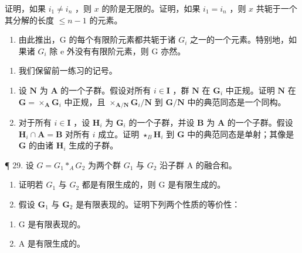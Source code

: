 证明，如果 \(i_1 \neq i_n\) ，则 \(x\) 的阶是无限的。证明，如果 \(i_1 = i_n\) ，则 \(x\) 共轭于一个其分解的长度 \(\leqslant n - 1\) 的元素。

\begin{enumerate}
\def\labelenumi{(\alph{enumi})}
\setcounter{enumi}{1}
\tightlist
\item
  由此推出，G 的每个有限阶元素都共轭于诸 \(G_{i}\) 之一的一个元素。特别地，如果诸 \(G_{i}\) 除 e 外没有有限阶元素，则 G 亦然。
\end{enumerate}

\begin{enumerate}
\def\labelenumi{\arabic{enumi}.}
\setcounter{enumi}{27}
\tightlist
\item
  我们保留前一练习的记号。
\end{enumerate}

\begin{enumerate}
\def\labelenumi{(\alph{enumi})}
\item
  设 \(\mathbf{N}\) 为 \(\mathbf{A}\) 的一个子群。假设对所有 \(i \in \mathbf{I}\) ，群 \(\mathbf{N}\) 在 \(\mathbf{G}_i\) 中正规。证明 \(\mathbf{N}\) 在 \(\mathbf{G} = \times_{\mathbf{A}} \mathbf{G}_i\) 中正规，且 \(\times_{\mathbf{A/N}} \mathbf{G}_i / \mathbf{N}\) 到 \(\mathbf{G}/\mathbf{N}\) 中的典范同态是一个同构。
\item
  对于所有 \(i \in \mathbf{I}\) ，设 \(\mathbf{H}_i\) 为 \(\mathbf{G}_i\) 的一个子群，并设 \(\mathbf{B}\) 为 \(\mathbf{A}\) 的一个子群。假设 \(\mathbf{H}_i \cap \mathbf{A} = \mathbf{B}\) 对所有 \(i\) 成立。证明 \(\star_B \mathbf{H}_i\) 到 \(\mathbf{G}\) 中的典范同态是单射；其像是 \(\mathbf{G}\) 的由诸 \(\mathbf{H}_i\) 生成的子群。
\end{enumerate}

¶ 29. 设 \(G = G_1 *_A G_2\) 为两个群 \(G_1\) 与 \(G_2\) 沿子群 A 的融合和。

\begin{enumerate}
\def\labelenumi{(\alph{enumi})}
\item
  证明若 \(G_{1}\) 与 \(G_{2}\) 都是有限生成的，则 G 是有限生成的。
\item
  假设 \(\mathbf{G}_1\) 与 \(\mathbf{G}_2\) 是有限表现的。证明下列两个性质的等价性：
\end{enumerate}

\begin{enumerate}
\def\labelenumi{(\arabic{enumi})}
\item
  G 是有限表现的。
\item
  A 是有限生成的。
\end{enumerate}

